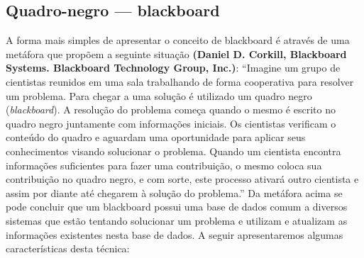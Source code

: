 \subsection{Quadro-negro --- blackboard}

	A forma mais simples de apresentar o conceito de blackboard é através de uma metáfora que propõem a seguinte situação \textbf{(Daniel D. Corkill, Blackboard Systems. Blackboard Technology Group, Inc.)}:
 “Imagine um grupo de cientistas reunidos em uma sala trabalhando de forma cooperativa para resolver um problema. Para chegar a uma solução é utilizado um quadro negro (\textit{blackboard}).
A resolução do problema começa quando o mesmo é escrito no quadro negro juntamente com informações iniciais. Os cientistas verificam o conteúdo do quadro e aguardam uma oportunidade para aplicar seus conhecimentos visando solucionar o problema. Quando um cientista encontra informações suficientes para fazer uma contribuição, o mesmo coloca sua contribuição no quadro negro, e com sorte, este processo ativará outro cientista e assim por diante até chegarem à solução do problema.”
	Da metáfora acima se pode concluir que um blackboard possui uma base de dados comum a diversos sistemas que estão tentando solucionar um problema e utilizam e atualizam as informações existentes nesta base de dados.
	 A seguir apresentaremos algumas características desta técnica:
